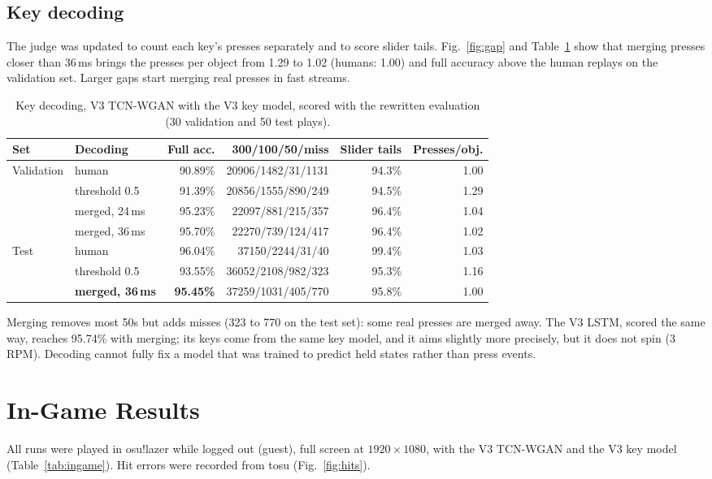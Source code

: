\documentclass[11pt,a4paper]{article}
\begin{document}
\subsection{Key decoding}
The judge was updated to count each key's presses separately and to score slider tails. Fig.~\ref{fig:gap}
and Table~\ref{tab:keys} show that merging presses closer than 36\,ms brings the presses per object from 1.29
to 1.02 (humans: 1.00) and full accuracy above the human replays on the validation set. Larger gaps start
merging real presses in fast streams.

\begin{table}[t]
\centering
\caption{Key decoding, V3 TCN-WGAN with the V3 key model, scored with the rewritten evaluation
(30 validation and 50 test plays).}
\label{tab:keys}
\small
\begin{tabular}{llrrrr}
\toprule
Set & Decoding & Full acc. & 300/100/50/miss & Slider tails & Presses/obj. \\
\midrule
\multirow{4}{*}{Validation} & human & 90.89\% & 20906/1482/31/1131 & 94.3\% & 1.00 \\
 & threshold 0.5 & 91.39\% & 20856/1555/890/249 & 94.5\% & 1.29 \\
 & merged, 24\,ms & 95.23\% & 22097/881/215/357 & 96.4\% & 1.04 \\
 & merged, 36\,ms & 95.70\% & 22270/739/124/417 & 96.4\% & 1.02 \\
\midrule
\multirow{3}{*}{Test} & human & 96.04\% & 37150/2244/31/40 & 99.4\% & 1.03 \\
 & threshold 0.5 & 93.55\% & 36052/2108/982/323 & 95.3\% & 1.16 \\
 & \textbf{merged, 36\,ms} & \textbf{95.45\%} & 37259/1031/405/770 & 95.8\% & 1.00 \\
\bottomrule
\end{tabular}
\end{table}

Merging removes most 50s but adds misses (323 to 770 on the test set): some real presses are merged away.
The V3 LSTM, scored the same way, reaches 95.74\% with merging; its keys come from the same key model, and it
aims slightly more precisely, but it does not spin (3 RPM).
Decoding cannot fully fix a model that was trained to predict held states rather than press events.

\section{In-Game Results}
All runs were played in osu!lazer while logged out (guest), full screen at $1920\times1080$, with the V3
TCN-WGAN and the V3 key model (Table~\ref{tab:ingame}). Hit errors were recorded from tosu
(Fig.~\ref{fig:hits}).
\end{document}
